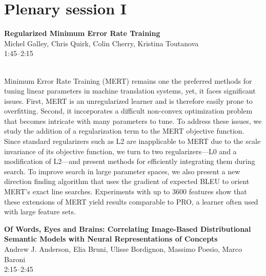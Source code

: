 \documentclass[twoside,makeidx]{book}
\begin{document}
\section{Plenary session I}
\vspace{-1em}
\par\vspace{2em}\noindent%
\begin{minipage}{\linewidth}%
\begin{center}
\textbf{\normalsize Regularized Minimum Error Rate Training}\\
\normalsize  Michel Galley,  Chris Quirk,  Colin Cherry,  Kristina Toutanova\\
{\small 1:45--2:15}\\
\end{center}
\end{minipage}\\[0.5em]
\nopagebreak%
\noindent%
{\small Minimum Error Rate Training (MERT) remains one the preferred methods for tuning linear parameters in machine translation systems, yet, it faces significant issues. First, MERT is an unregularized learner and is therefore easily prone to overfitting. Second, it incorporates a difficult non-convex optimization problem that becomes intricate with many parameters to tune. To address these issues, we study the addition of a regularization term to the MERT objective function. Since standard regularizers such as L2 are inapplicable to MERT due to the scale invariance of its objective function, we turn to two regularizers---L0 and a modification of L2---and present methods for efficiently integrating them during search. To improve search in large parameter spaces, we also present a new direction finding algorithm that uses the gradient of expected BLEU to orient MERT's exact line searches. Experiments with up to 3600 features show that these extensions of MERT yield results comparable to PRO, a learner often used with large feature sets.}
\par\vspace{2em}\noindent%
\begin{minipage}{\linewidth}%
\begin{center}
\textbf{\normalsize Of Words, Eyes and Brains: Correlating Image-Based Distributional Semantic Models with Neural Representations of Concepts}\\
\normalsize  Andrew J. Anderson,  Elia Bruni,  Ulisse Bordignon,  Massimo Poesio,  Marco Baroni\\
{\small 2:15--2:45}\\
\end{center}
\end{minipage}\\[0.5em]
\end{document}
